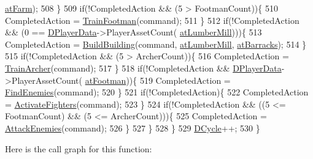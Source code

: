 \begin{DoxyCode}
      \hyperlink{GameDataTypes_8h_a5600d4fc433b83300308921974477feca406eab24dcbad1858522aca11b1088f5}{atFarm});
508             \}
509             \textcolor{keywordflow}{if}(!CompletedAction && (5 > FootmanCount))\{
510                 CompletedAction = \hyperlink{classCAIPlayer_aa3f9c1d0d449a45a24e065d2086527b0}{TrainFootman}(command);
511             \}
512             \textcolor{keywordflow}{if}(!CompletedAction && (0 == \hyperlink{classCAIPlayer_a83b5113c8f7e80df54940b647c5ee2e6}{DPlayerData}->PlayerAssetCount(
      \hyperlink{GameDataTypes_8h_a5600d4fc433b83300308921974477feca7bb38316bc3193b5c9ec67ea6aad549c}{atLumberMill})))\{
513                 CompletedAction = \hyperlink{classCAIPlayer_a2ff5263cbaa6bfc62ffec4dbce87ba88}{BuildBuilding}(command, 
      \hyperlink{GameDataTypes_8h_a5600d4fc433b83300308921974477feca7bb38316bc3193b5c9ec67ea6aad549c}{atLumberMill}, \hyperlink{GameDataTypes_8h_a5600d4fc433b83300308921974477feca1cbf6c944f30d615a247eef1f57b2230}{atBarracks});
514             \}
515             \textcolor{keywordflow}{if}(!CompletedAction &&  (5 > ArcherCount))\{
516                 CompletedAction = \hyperlink{classCAIPlayer_af2edf1e3c54d6af693f768f86d484fd6}{TrainArcher}(command);
517             \}
518             \textcolor{keywordflow}{if}(!CompletedAction && \hyperlink{classCAIPlayer_a83b5113c8f7e80df54940b647c5ee2e6}{DPlayerData}->PlayerAssetCount(
      \hyperlink{GameDataTypes_8h_a5600d4fc433b83300308921974477fecad586e8ff9ee846d22630c2066e8fb7c2}{atFootman}))\{
519                 CompletedAction = \hyperlink{classCAIPlayer_a33b1533570e7a00114d1b85b3551e395}{FindEnemies}(command);
520             \}
521             \textcolor{keywordflow}{if}(!CompletedAction)\{
522                 CompletedAction = \hyperlink{classCAIPlayer_a4216d7e76315234a4fe22fb3a0a89c1d}{ActivateFighters}(command);
523             \}
524             \textcolor{keywordflow}{if}(!CompletedAction && ((5 <= FootmanCount) && (5 <= ArcherCount)))\{
525                 CompletedAction = \hyperlink{classCAIPlayer_adf7feeba7debf9f19b000887616d7bfb}{AttackEnemies}(command);
526             \}
527         \}
528     \}
529     \hyperlink{classCAIPlayer_adf12a7afe7ea86410b18eff47fa95253}{DCycle}++;
530 \}
\end{DoxyCode}
Here is the call graph for this function\+:
\nopagebreak
